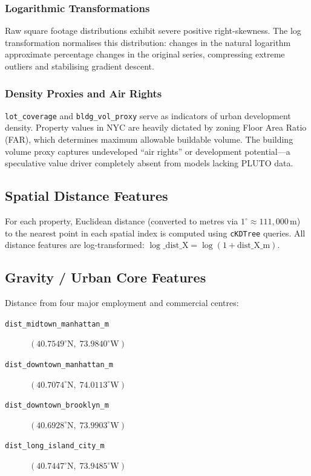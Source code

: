 \documentclass[11pt, a4paper, twoside]{article}
\begin{document}
\subsubsection{Logarithmic Transformations}
Raw square footage distributions exhibit severe positive right-skewness.
The log transformation normalises this distribution: changes in the natural
logarithm approximate percentage changes in the original series, compressing
extreme outliers and stabilising gradient descent.

\subsubsection{Density Proxies and Air Rights}
\texttt{lot\_coverage} and \texttt{bldg\_vol\_proxy} serve as indicators of
urban development density. Property values in NYC are heavily dictated by
zoning Floor Area Ratio (FAR), which determines maximum allowable buildable
volume. The building volume proxy captures undeveloped ``air rights'' or
development potential---a speculative value driver completely absent from models
lacking PLUTO data.

\subsection{Spatial Distance Features}
For each property, Euclidean distance (converted to metres via
$1^\circ \approx 111{,}000\,\text{m}$) to the nearest point in each spatial
index is computed using \texttt{cKDTree} queries. All distance features are
log-transformed: $\log\text{\_dist\_X} = \log(1 + \text{dist\_X\_m})$.

\subsection{Gravity / Urban Core Features}
Distance from four major employment and commercial centres:
\begin{description}
  \item[\texttt{dist\_midtown\_manhattan\_m}]  $(40.7549^\circ\text{N},\;73.9840^\circ\text{W})$
  \item[\texttt{dist\_downtown\_manhattan\_m}] $(40.7074^\circ\text{N},\;74.0113^\circ\text{W})$
  \item[\texttt{dist\_downtown\_brooklyn\_m}]  $(40.6928^\circ\text{N},\;73.9903^\circ\text{W})$
  \item[\texttt{dist\_long\_island\_city\_m}]  $(40.7447^\circ\text{N},\;73.9485^\circ\text{W})$
\end{description}
\end{document}
